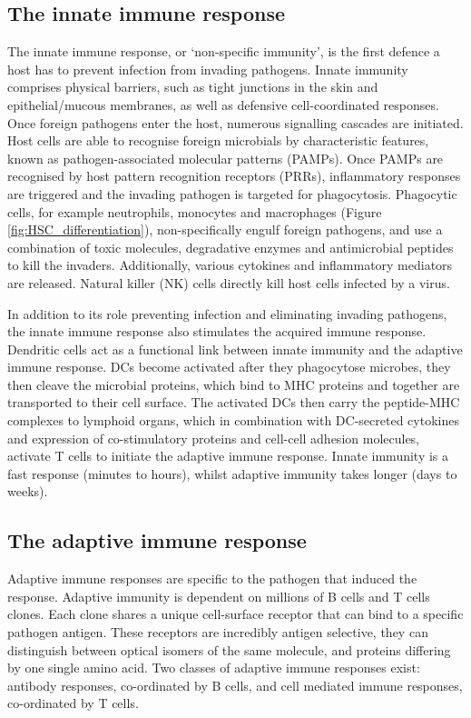 \subsection{The innate immune response}
The innate immune response, or `non-specific immunity', is the first defence a host has to prevent infection from invading pathogens.
Innate immunity comprises physical barriers, such as tight junctions in the skin and epithelial/mucous membranes, as well as defensive cell-coordinated responses.
Once foreign pathogens enter the host, numerous signalling cascades are initiated.
Host cells are able to recognise foreign microbials by characteristic features, known as pathogen-associated molecular patterns (PAMPs).
Once PAMPs are recognised by host pattern recognition receptors (PRRs), inflammatory responses are triggered and the invading pathogen is targeted for phagocytosis.
Phagocytic cells, for example neutrophils, monocytes and macrophages (Figure \ref{fig:HSC_differentiation}), non-specifically engulf foreign pathogens, and use a combination of toxic molecules, degradative enzymes and antimicrobial peptides to kill the invaders.
Additionally, various cytokines and inflammatory mediators are released.
Natural killer (NK) cells directly kill host cells infected by a virus.

In addition to its role preventing infection and eliminating invading pathogens, the innate immune response also stimulates the acquired immune response.
Dendritic cells act as a functional link between innate immunity and the adaptive immune response.
DCs become activated after they phagocytose microbes, they then cleave the microbial proteins, which bind to MHC proteins and together are transported to their cell surface.
The activated DCs then carry the peptide-MHC complexes to lymphoid organs, which in combination with DC-secreted cytokines and expression of co-stimulatory proteins and cell-cell adhesion molecules, activate T cells to initiate the adaptive immune response.
Innate immunity is a fast response (minutes to hours), whilst adaptive immunity takes longer (days to weeks).

\subsection{The adaptive immune response}
Adaptive immune responses are specific to the pathogen that induced the response.
Adaptive immunity is dependent on millions of B cells and T cells clones.
Each clone shares a unique cell-surface receptor that can bind to a specific pathogen antigen.
These receptors are incredibly antigen selective, they can distinguish between optical isomers of the same molecule, and proteins differing by one single amino acid.
Two classes of adaptive immune responses exist: antibody responses, co-ordinated by B cells, and cell mediated immune responses, co-ordinated by T cells.
%
